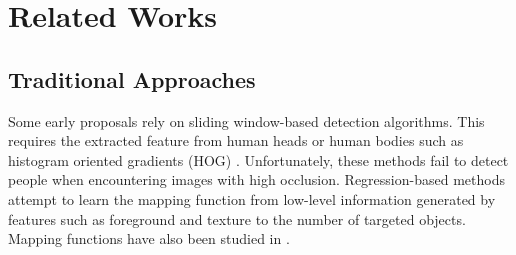 \documentclass[10pt, conference, a4paper]{IEEEtran}
\begin{document}
\section{Related Works}


\subsection{Traditional Approaches}
Some early proposals rely on sliding window-based detection algorithms. This requires the extracted feature from human heads or human bodies such as histogram oriented gradients (HOG) \cite{dalal2005histograms}. Unfortunately, these methods fail to detect people when encountering images with high occlusion. Regression-based methods attempt to learn the mapping function from low-level information \cite{chan2009bayesian} generated by features such as foreground and texture to the number of targeted objects. Mapping functions have also been studied in \cite{lempitsky2010learning}.
\end{document}
